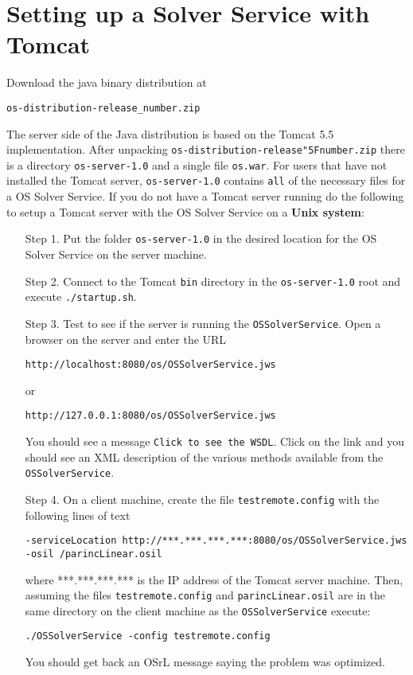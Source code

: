 \documentclass[11pt]{article}
\renewcommand{\_}{{\char"5F}}
\renewcommand{\{}{{\char"7B}}
\renewcommand{\}}{{\char"7D}}
\renewcommand{\^}{{\char"0D}}
\renewcommand{\'}{{\char"0D}}
\begin{document}
\section{Setting up a Solver Service with Tomcat}\label{section:tomcat}

Download the java binary distribution at
\begin{verbatim}
os-distribution-release_number.zip
\end{verbatim}

The server side of the Java distribution is based on the Tomcat 5.5 implementation. After unpacking {\tt os-distribution-release\_number.zip} there is a directory {\tt os-server-1.0} and a single file {\tt os.war}.  For users that have not installed the Tomcat server,   {\tt os-server-1.0} contains {\tt all} of the necessary files for a OS Solver Service.  If you do not have a Tomcat server running do the following to setup a  Tomcat server  with the OS Solver Service on a {\bf Unix system}:

\begin{itemize}
\item[Step 1.]  Put the folder  {\tt os-server-1.0}   in the desired location for the OS Solver Service on the server machine.

\item[Step 2.] Connect to the Tomcat {\tt bin} directory in the {\tt os-server-1.0} root and execute {\tt ./startup.sh}.

\item[Step 3.] Test to see if the server is running the {\tt OSSolverService}.  Open a browser on the server and enter the URL
\begin{verbatim}
http://localhost:8080/os/OSSolverService.jws
\end{verbatim}
or
\begin{verbatim}
http://127.0.0.1:8080/os/OSSolverService.jws
\end{verbatim}
You should see a message {\tt Click to see the WSDL}.  Click on the link and you should see an XML description of the various methods available from the {\tt OSSolverService}.

\item[Step 4.]  On a client machine, create  the file {\tt testremote.config} with the following lines of text
\begin{verbatim}
-serviceLocation http://***.***.***.***:8080/os/OSSolverService.jws
-osil /parincLinear.osil
\end{verbatim}
where ***.***.***.*** is the IP address of the Tomcat server machine. Then, assuming the files {\tt testremote.config} and {\tt parincLinear.osil} are in the same directory on the client machine as the {\tt OSSolverService} execute:
\begin{verbatim}
./OSSolverService -config testremote.config
\end{verbatim}
You should get back an OSrL message saying the problem was optimized.

\end{itemize}
\end{document}
